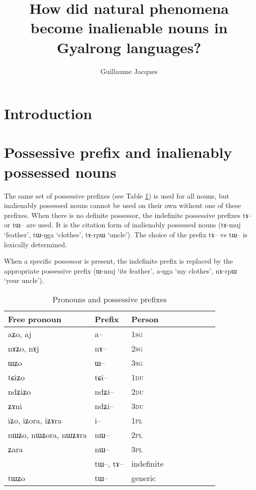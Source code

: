 \documentclass[oldfontcommands,oneside,a4paper,11pt]{article}
\newcommand{\ipa}[1]{{\phon #1}} %
\begin{document}
 
 \title{How did natural phenomena become inalienable nouns in Gyalrong languages?}
 \author{Guillaume Jacques}
 \maketitle
 
 
 \section{Introduction}

\section{Possessive prefix and inalienably possessed nouns}


The same set of possessive prefixes (see Table \ref{tab:pronoun}) is used for all nouns, but inalienably possessed nouns cannot be used on their own without one of these prefixes. When there is no definite possessor, the indefinite possessive prefixes \ipa{tɤ--} or \ipa{tɯ--} are used. It is the citation form of inalienably possessed nouns (\ipa{tɤ-muj} `feather', \ipa{tɯ-ŋga} `clothes', \ipa{tɤ-rpɯ} `uncle'). The choice of the prefix \ipa{tɤ--} vs \ipa{tɯ--} is lexically determined.  

When a specific possessor is present, the indefinite prefix is replaced by the appropriate possessive prefix (\ipa{ɯ-muj} `its feather', \ipa{a-ŋga} `my clothes', \ipa{nɤ-rpɯ} `your uncle'). 



\begin{table}[H] \centering
\caption{Pronouns and possessive prefixes }\label{tab:pronoun}
\begin{tabular}{lllllllll} 
\toprule
 Free pronoun & Prefix & Person\\
\midrule
 \ipa{aʑo},    \ipa{aj} &	\ipa{a--}  &		1\textsc{sg} \\
\ipa{nɤʑo},  \ipa{nɤj} &	\ipa{nɤ--}  &			2\textsc{sg}\\
\ipa{ɯʑo}  &	\ipa{ɯ--}  &			3\textsc{sg}\\
\midrule
\ipa{tɕiʑo}  &	\ipa{tɕi--}  &			1\textsc{du} \\
\ipa{ndʑiʑo}  &	\ipa{ndʑi--}  &		2\textsc{du} \\	
\ipa{ʑɤni}  &	\ipa{ndʑi--}  &		3\textsc{du} \\	
\midrule
\ipa{iʑo}, \ipa{iʑora},   \ipa{iʑɤra}   &	\ipa{i--}  &			1\textsc{pl} \\
\ipa{nɯʑo}, \ipa{nɯʑora},   \ipa{nɯʑɤra}  &	\ipa{nɯ--}  &			2\textsc{pl} \\
\ipa{ʑara}  &	\ipa{nɯ--}  &			3\textsc{pl} \\
\midrule
&  \ipa{tɯ--},  \ipa{tɤ--} & indefinite \\
\ipa{tɯʑo} & \ipa{tɯ--}   &  generic\\
\bottomrule
\end{tabular}
\end{table}
\end{document}
